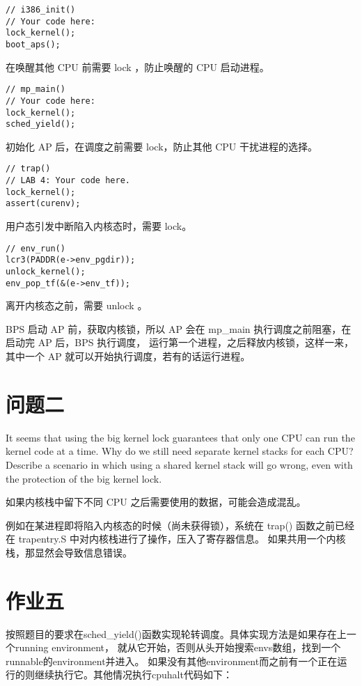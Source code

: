 \documentclass[12pt,a4paper]{article}
\begin{document}
\begin{lstlisting}[style=CPP]
// i386_init()
// Your code here:
lock_kernel();
boot_aps();
\end{lstlisting}

在唤醒其他 CPU 前需要 lock ，防止唤醒的 CPU 启动进程。
\begin{lstlisting}[style=CPP]
// mp_main()
// Your code here:
lock_kernel();
sched_yield();
\end{lstlisting}

初始化 AP 后，在调度之前需要 lock，防止其他 CPU 干扰进程的选择。
\begin{lstlisting}[style=CPP]
// trap()
// LAB 4: Your code here.
lock_kernel();
assert(curenv);
\end{lstlisting}

用户态引发中断陷入内核态时，需要 lock。
\begin{lstlisting}[style=CPP]
// env_run()
lcr3(PADDR(e->env_pgdir));
unlock_kernel();
env_pop_tf(&(e->env_tf));
\end{lstlisting}

离开内核态之前，需要 unlock 。

BPS 启动 AP 前，获取内核锁，所以 AP 会在 mp\_main 执行调度之前阻塞，在启动完 AP 后，BPS 执行调度，
运行第一个进程，之后释放内核锁，这样一来，其中一个 AP 就可以开始执行调度，若有的话运行进程。

\section{问题二}

It seems that using the big kernel lock guarantees that only one CPU can run the kernel code at a time. 
Why do we still need separate kernel stacks for each CPU? 
Describe a scenario in which using a shared kernel stack will go wrong, even with the protection of the big kernel lock.

如果内核栈中留下不同 CPU 之后需要使用的数据，可能会造成混乱。

例如在某进程即将陷入内核态的时候（尚未获得锁），系统在 trap() 函数之前已经在 trapentry.S 中对内核栈进行了操作，压入了寄存器信息。
如果共用一个内核栈，那显然会导致信息错误。

\section{作业五}

按照题目的要求在sched\_yield()函数实现轮转调度。具体实现方法是如果存在上一个running environment，
就从它开始，否则从头开始搜索envs数组，找到一个runnable的environment并进入。
如果没有其他environment而之前有一个正在运行的则继续执行它。其他情况执行cpuhalt代码如下：
\end{document}
